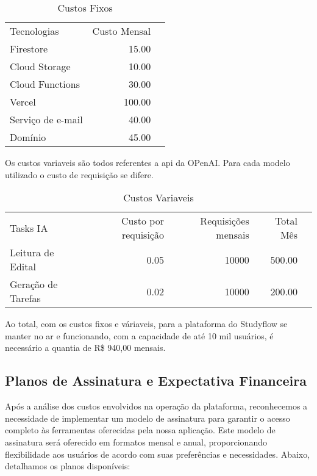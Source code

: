 \begin{table}[!htp]
\centering
\caption{Custos Fixos}\label{tab: Custos Fixos}
\scriptsize
\begin{tabular}{lrr}\toprule
Tecnologias &Custo Mensal \\\cmidrule{1-2}
Firestore &15.00 \\\cmidrule{1-2}
Cloud Storage &10.00 \\\cmidrule{1-2}
Cloud Functions &30.00 \\\cmidrule{1-2}
Vercel &100.00 \\\cmidrule{1-2}
Serviço de e-mail &40.00 \\\cmidrule{1-2}
Domínio &45.00 \\\midrule
\bottomrule
\end{tabular}
\end{table}

Os custos variaveis são todos referentes a \acs{api} da OPenAI. Para cada modelo utilizado o custo de requisição se difere. 

\begin{table}[!htp]\centering
\caption{Custos Variaveis}\label{tab: Custos Variaveis}
\scriptsize
\begin{tabular}{lrrrr}\toprule
Tasks IA &Custo por requisição &Requisições mensais &Total Mês \\\cmidrule{1-4}
Leitura de Edital &0.05 &10000 &500.00 \\\cmidrule{1-4}
Geração de Tarefas &0.02 &10000 &200.00 \\\midrule
\bottomrule
\end{tabular}
\end{table}

Ao total, com os custos fixos e váriaveis, para a plataforma do Studyflow se manter no ar e funcionando, com a capacidade de até 10 mil usuários, é necessário a quantia de R\$ 940,00 mensais.
\subsection{Planos de Assinatura e Expectativa Financeira}

Após a análise dos custos envolvidos na operação da plataforma, reconhecemos a necessidade de implementar um modelo de assinatura para garantir o acesso completo às ferramentas oferecidas pela nossa aplicação. Este modelo de assinatura será oferecido em formatos mensal e anual, proporcionando flexibilidade aos usuários de acordo com suas preferências e necessidades. Abaixo, detalhamos os planos disponíveis:

